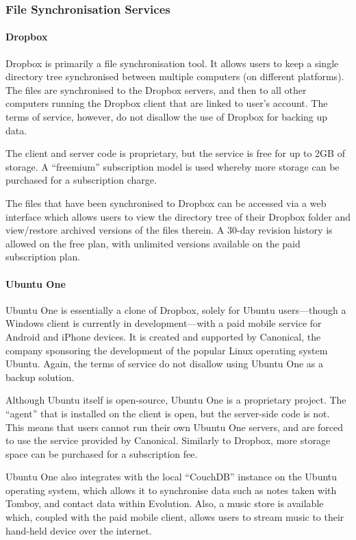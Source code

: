 \subsubsection{File Synchronisation Services}

\paragraph{Dropbox}

Dropbox is primarily a file synchronisation tool. It allows users to keep
a single directory tree synchronised between multiple computers (on different
platforms). The files are synchronised to the Dropbox servers, and then to all
other computers running the Dropbox client that are linked to user's account.
The terms of service, however, do not disallow the use of Dropbox for backing
up data.

The client and server code is proprietary, but the service is free for up to
2GB of storage. A ``freemium'' subscription model is used whereby more storage
can be purchased for a subscription charge.

The files that have been synchronised to Dropbox can be accessed via a web
interface which allows users to view the directory tree of their Dropbox folder
and view/restore archived versions of the files therein. A 30-day revision
history is allowed on the free plan, with unlimited versions available on the
paid subscription plan.

\paragraph{Ubuntu One}

Ubuntu One is essentially a clone of Dropbox, solely for Ubuntu users---though
a Windows client is currently in development---with a paid mobile service for
Android and iPhone devices. It is created and supported by Canonical, the
company sponsoring the development of the popular Linux operating system
Ubuntu. Again, the terms of service do not disallow using Ubuntu One as
a backup solution.

Although Ubuntu itself is open-source, Ubuntu One is a proprietary project. The
``agent'' that is installed on the client is open, but the server-side code is
not. This means that users cannot run their own Ubuntu One servers, and are
forced to use the service provided by Canonical. Similarly to Dropbox, more storage space can
be purchased for a subscription fee.

Ubuntu One also integrates with the local ``CouchDB'' instance on the Ubuntu
operating system, which allows it to synchronise data such as notes taken with
Tomboy, and contact data within Evolution. Also, a music store is available
which, coupled with the paid mobile client, allows users to stream music to
their hand-held device over the internet.

